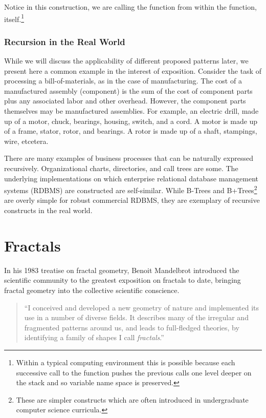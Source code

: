 \documentclass[jou,apacite]{apa6}
\begin{document}
Notice in this construction, we are calling the function from within the function, itself.\footnote{Within a typical computing environment this is possible because each successive call to the function pushes the previous calls one level deeper on the stack and so variable name space is preserved.}

\subsubsection{Recursion in the Real World}  %
While we will discuss the applicability of different proposed patterns later, we present here a common example in the interest of exposition.  Consider the task of processing a bill-of-materials, as in the case of manufacturing. The cost of a manufactured assembly (component) is the sum of the cost of component parts plus any associated labor and other overhead. However, the component parts themselves may be manufactured assemblies.  For example, an electric drill, made up
of a motor, chuck, bearings, housing, switch, and a cord. A motor is made up of a frame, stator, rotor, and bearings.  A rotor is made up of a shaft, stampings, wire, etcetera.

There are many examples of business processes that can be naturally expressed recursively.  Organizational charts, directories, and call trees are some.  The underlying implementations on which enterprise relational database management systems (RDBMS) are constructed are self-similar.  While B-Trees and B+Trees\footnote{These are simpler constructs which are often introduced in undergraduate computer science curricula.} are overly simple for robust commercial RDBMS, they are
exemplary of recursive constructs in the real world.

\section{Fractals}  %
In his 1983 treatise on fractal geometry, Benoit Mandelbrot introduced the scientific community to the greatest exposition on fractals to date, bringing fractal geometry into the collective scientific conscience.
\begin{quote}
  ``I conceived and developed a new geometry of nature and implemented its use in a number of diverse fields.  It describes many of the irregular and fragmented patterns around us, and leads to full-fledged theories, by identifying a family of shapes I call \emph{fractals}.''~\cite{Mandelbrot}
\end{quote}
\end{document}
